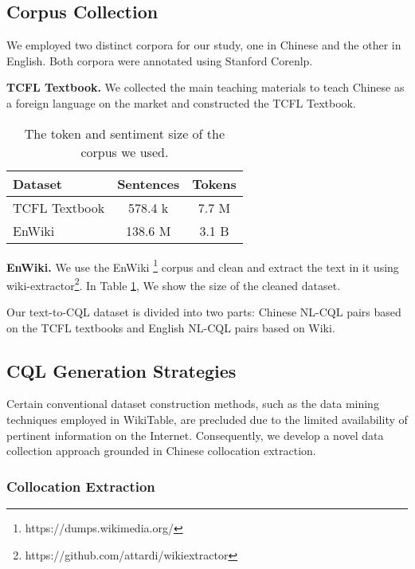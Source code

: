 \documentclass[11pt]{article}
\begin{document}
\begin{CJK*}{UTF8}{gbsn}
\subsection{Corpus Collection}
We employed two distinct corpora for our study, one in Chinese and the other in English. Both corpora were annotated using Stanford Corenlp.

\textbf{TCFL Textbook.} We collected the main teaching materials to teach Chinese as a foreign language on the market and constructed the TCFL Textbook.


\begin{table}[h!]
\centering
\begin{tabular}{lcc}
\toprule
\textbf{Dataset} & \textbf{Sentences} & \textbf{Tokens}\\
\midrule
TCFL Textbook & 578.4 k & 7.7 M  \\
EnWiki & 138.6 M & 3.1 B  \\
\bottomrule
\end{tabular}
\caption{The token and sentiment size of the corpus we used.}
\label{tab:corpusScale}
\end{table}



\textbf{EnWiki.} We use the EnWiki \citep{enwiki}\footnote{ https://dumps.wikimedia.org/} corpus and clean and extract the text in it using wiki-extractor\footnote{https://github.com/attardi/wikiextractor}\citep{Wikiextractor2015}.  In Table \ref{tab:corpusScale}, We show the size of the cleaned dataset.

Our text-to-CQL dataset is divided into two parts: Chinese NL-CQL pairs based on the TCFL textbooks and English NL-CQL pairs based on Wiki.
\subsection{CQL Generation Strategies}

Certain conventional dataset construction methods, such as the data mining techniques employed in WikiTable\citep{wikitable}, are precluded due to the limited availability of pertinent information on the Internet. Consequently, we develop a novel data collection approach grounded in Chinese collocation extraction.

\subsubsection{Collocation Extraction}


\end{CJK*}
\end{document}
